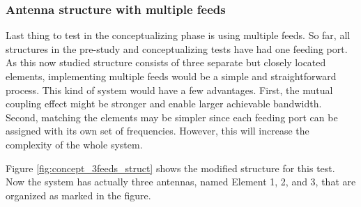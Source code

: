 \subsubsection{Antenna structure with multiple feeds}
\label{sec:multiple_feeds}
Last thing to test in the conceptualizing phase is using multiple feeds. So far, all structures in the pre-study and conceptualizing tests have had one feeding port. As this now studied structure consists of three separate but closely located elements, implementing multiple feeds would be a simple and straightforward process. This kind of system would have a few advantages. First, the mutual coupling effect might be stronger and enable larger achievable bandwidth. Second, matching the elements may be simpler since each feeding port can be assigned with its own set of frequencies. However, this will increase the complexity of the whole system.

Figure \ref{fig:concept_3feeds_struct} shows the modified structure for this test. Now the system has actually three antennas, named Element 1, 2, and 3, that are organized as marked in the figure.

